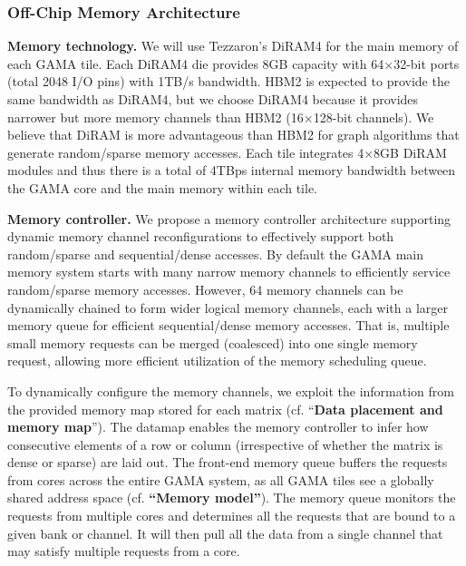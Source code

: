 \subsubsection{Off-Chip Memory Architecture} 
\label{sec:memory:off-chip}
\noindent
\textbf{Memory technology.} 
We will use  Tezzaron's DiRAM4 for the main memory of each GAMA tile.  
Each DiRAM4 die provides 8GB capacity with 64$\times$32-bit ports (total 2048 I/O pins) with 1TB/s bandwidth. 
HBM2 is expected to provide the same bandwidth as DiRAM4, but we choose DiRAM4 because it provides narrower but more memory channels than HBM2 (16$\times$128-bit channels). 
We believe that DiRAM is more advantageous than HBM2 for graph algorithms that generate random/sparse memory accesses. 
Each tile integrates 4$\times$8GB DiRAM modules and thus there is a total of 4TBps internal memory bandwidth between the GAMA core and the main memory within each tile. 


\vspace{3pt}
\noindent
\textbf{Memory controller.} 
We propose a memory controller architecture supporting dynamic memory channel reconfigurations to effectively support both random/sparse and sequential/dense accesses.
By default the GAMA main memory system starts with many narrow memory channels to efficiently service random/sparse memory accesses.
However, %
64 memory channels can be dynamically chained to form wider logical memory channels, each with a larger memory queue for efficient sequential/dense memory accesses.
That is, multiple small memory requests can be merged (coalesced) into one single memory request, allowing more efficient utilization of the memory scheduling queue.


To dynamically configure the memory channels, we exploit the information from the provided memory map stored for each matrix (cf. ``\textbf{Data placement and memory map}'').
The datamap enables the memory controller to infer how consecutive elements of a row or column (irrespective of whether the matrix is dense or sparse) are laid out. 
The front-end memory queue buffers the requests from cores across the entire GAMA system, as all GAMA tiles see a globally shared address space (cf. \textbf{``Memory model''}). 
The memory queue monitors the requests from multiple cores and determines all the requests that are bound to a given bank or channel. 
It will then pull all the data from a single channel that may satisfy multiple requests from a core.  



